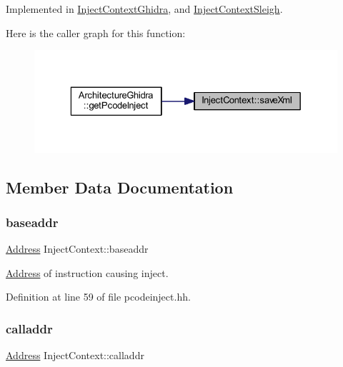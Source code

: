 Implemented in \mbox{\hyperlink{class_inject_context_ghidra_a32151798bd5739d2afecf9f0824de4e8}{Inject\+Context\+Ghidra}}, and \mbox{\hyperlink{class_inject_context_sleigh_a5f54348510c2aa5002d93d3fbf0c645a}{Inject\+Context\+Sleigh}}.

Here is the caller graph for this function\+:
\nopagebreak
\begin{figure}[H]
\begin{center}
\leavevmode
\includegraphics[width=329pt]{class_inject_context_a85884d6d9e18996f0b03aa10a4e11be6_icgraph}
\end{center}
\end{figure}


\subsection{Member Data Documentation}
\mbox{\label{class_inject_context_ab42964a9a9f4ec747a1734b553898ff0}} 
\subsubsection{\texorpdfstring{baseaddr}{baseaddr}}
{\footnotesize\ttfamily \mbox{\hyperlink{class_address}{Address}} Inject\+Context\+::baseaddr}



\mbox{\hyperlink{class_address}{Address}} of instruction causing inject. 



Definition at line 59 of file pcodeinject.\+hh.

\mbox{\label{class_inject_context_a472f5669e9817cd95cd91ea36572da1f}} 
\subsubsection{\texorpdfstring{calladdr}{calladdr}}
{\footnotesize\ttfamily \mbox{\hyperlink{class_address}{Address}} Inject\+Context\+::calladdr}




